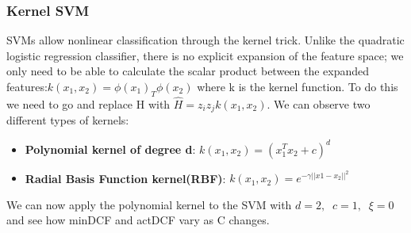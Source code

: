 \documentclass{article}
\begin{document}
\subsubsection{Kernel SVM}
SVMs allow nonlinear classification through the kernel trick. 
Unlike the quadratic logistic regression classifier, there is no explicit expansion of the feature space; 
we only need to be able to calculate the scalar product between the expanded features:\( k(x_1,x_2)=\phi(x_1)_T\phi(x_2)\) where k is the kernel function.
To do this we need to go and replace H with \(\hat{H}= z_iz_jk(x_1,x_2)\). 
We can observe two different types of kernels:
\begin{itemize}
    \item \textbf{Polynomial kernel of degree d}: \(k(x_1,x_2)=(x_1^Tx_2+c)^d\)
    \item \textbf{Radial Basis Function kernel(RBF)}: \(k(x_1,x_2)=e^{-\gamma||x1-x_2||^2}\)
\end{itemize}
We can now apply the polynomial kernel to the SVM with \(d=2,\;\; c=1, \;\;\xi=0\) and see how minDCF and actDCF vary as C changes.
\end{document}
